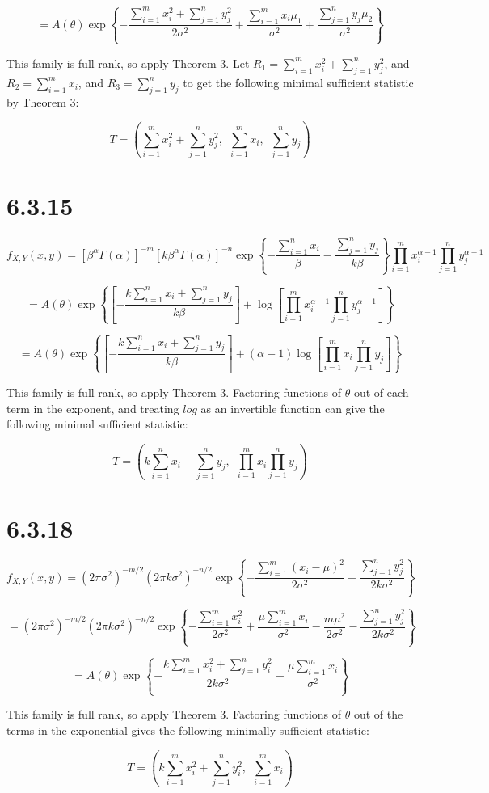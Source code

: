 \documentclass{article}
\begin{document}
\[
= A(\theta) 
\exp \left\{ -\frac{\sum_{i=1}^m x_i^2 + \sum_{j=1}^n y_j^2}{2\sigma^2} +
\frac{\sum_{i=1}^m x_i\mu_1}{\sigma^2} + \frac{\sum_{j=1}^n y_j\mu_2}{\sigma^2}
\right\}
\]

This family is full rank, so apply Theorem 3. 
Let $R_1 = \sum_{i=1}^m x_i^2 + \sum_{j=1}^n y_j^2$, and
$R_2 = \sum_{i=1}^m x_i$, and $R_3 = \sum_{j=1}^n y_j$ to get the following
minimal sufficient statistic by Theorem 3:

\[
T = \left(\sum_{i=1}^m x_i^2 + \sum_{j=1}^n y_j^2, \ \ 
\sum_{i=1}^m x_i, \ \ \sum_{j=1}^n y_j\right)
\]

\section{6.3.15}

\[
f_{X,Y}(x,y) = 
[\beta^{\alpha}\Gamma(\alpha)]^{-m}[k\beta^{\alpha}\Gamma(\alpha)]^{-n}
\exp \left\{-\frac{\sum_{i=1}^n x_i}{\beta} 
-\frac{\sum_{j=1}^n y_j}{k\beta}\right\}
\prod_{i=1}^mx_i^{\alpha-1}\prod_{j=1}^ny_j^{\alpha-1}
\]

\[
= A(\theta) 
\exp \left\{ \left[-\frac{k\sum_{i=1}^n x_i + \sum_{j=1}^n y_j}{k\beta}
\right] + \log \left[ \prod_{i=1}^mx_i^{\alpha-1}\prod_{j=1}^ny_j^{\alpha-1}
\right] \right\}
\]

\[
= A(\theta) 
\exp \left\{ \left[-\frac{k\sum_{i=1}^n x_i + \sum_{j=1}^n y_j}{k\beta}
\right] + (\alpha-1)\log \left[ \prod_{i=1}^mx_i\prod_{j=1}^ny_j
\right] \right\}
\]

This family is full rank, so apply Theorem 3.
Factoring functions of $\theta$ out of each term in the exponent, and treating
$log$ as an invertible function can give the following minimal sufficient
statistic:

\[
T = \left( k\sum_{i=1}^n x_i + \sum_{j=1}^n y_j, 
\ \ \prod_{i=1}^mx_i\prod_{j=1}^ny_j \right)
\]

\section{6.3.18}

\[
f_{X,Y}(x,y) = (2\pi\sigma^2)^{-m/2}(2\pi k\sigma^2)^{-n/2}
\exp \left\{-\frac{\sum_{i=1}^m(x_i-\mu)^2}{2\sigma^2}
-\frac{\sum_{j=1}^n y_j^2}{2k\sigma^2} \right\}
\]

\[
= (2\pi\sigma^2)^{-m/2}(2\pi k\sigma^2)^{-n/2}
\exp \left\{-\frac{\sum_{i=1}^mx_i^2}{2\sigma^2} +
\frac{\mu\sum_{i=1}^m x_i}{\sigma^2} - \frac{m\mu^2}{2\sigma^2}
-\frac{\sum_{j=1}^n y_j^2}{2k\sigma^2} \right\}
\]

\[
= A(\theta) \exp \left\{-\frac{k\sum_{i=1}^mx_i^2+\sum_{j=1}^ny_i^2}{2k\sigma^2}
+ \frac{\mu\sum_{i=1}^m x_i}{\sigma^2} \right\}
\]

This family is full rank, so apply Theorem 3. Factoring functions of $\theta$
out of the terms
in the exponential gives the following minimally sufficient statistic:

\[
T = \left(k\sum_{i=1}^mx_i^2+\sum_{j=1}^ny_i^2, \ \ \sum_{i=1}^m x_i \right)
\]
\end{document}
